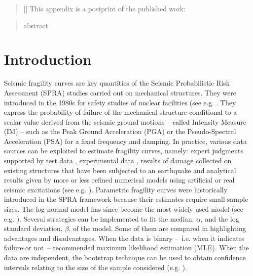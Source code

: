 

\begin{abstract}[\hspace*{-10pt}]
    This appendix is a postprint of the published work:   %
\end{abstract}

\begin{abstract}
    abstract
\end{abstract}

\minitoc

\section{Introduction}


Seismic fragility curves are key quantities of the Seismic Probabilistic Risk Assessment (SPRA) studies carried out on mechanical structures. They were introduced in the 1980s for safety studies of nuclear facilities (see e.g.
\cite{kennedy_probabilistic_1980,kennedy_seismic_1984,park_survey_1998,kennedy_risk_1999,cornell_hazard_2004}.
They express the probability of failure of the mechanical structure conditional to a scalar value derived from the seismic ground motions -- called Intensity Measure (IM) -- such as the Peak Ground Acceleration (PGA) or the Pseudo-Spectral Acceleration (PSA) for a fixed frequency and damping. In practice, various data sources can be exploited to estimate fragility curves, namely: expert judgments supported by test data \cite{Kennedy1980,KENNEDY198447,PARK1998,Zentner2017}, experimental data \cite{PARK1998, Gardoni2002, Choe2007}, results of damage collected on existing structures that have been subjected to an earthquake  \cite{Shinozuka2000, Lallemant2015, Straub2008} and analytical results given by more or less refined numerical models using artificial or real seismic excitations (see e.g. \cite{ZENTNER20101614, WangF2020,MANDAL201611,WANGZ2018,WANG2018232,ZHAO2020103}). Parametric fragility curves were historically introduced in the SPRA framework because their estimates require small sample sizes. The log-normal model has since become the most widely used model (see e.g. \cite{Shinozuka2000,Lallemant2015,Straub2008,
ZENTNER20101614, WangF2020, MANDAL201611, WANGZ2018, WANG2018232, ZHAO2020103, ELLINGWOOD2001251, KIM2004, Mai2017, TREVLOPOULOS2019,Katayama2021}).
Several strategies can be implemented to fit the median, $\alpha$, and the log standard deviation, $\beta$, of the model. Some of them are compared in \cite{Lallemant2015} highlighting advantages and disadvantages.
When the data is binary --~i.e. when it indicates failure or not~-- \cite{Lallemant2015} recommended maximum likelihood estimation (MLE). When the data are independent, the bootstrap technique can be used to obtain confidence intervals relating to the size of the sample considered (e.g. \cite{Shinozuka2000, ZENTNER20101614, WangF2020}). 

